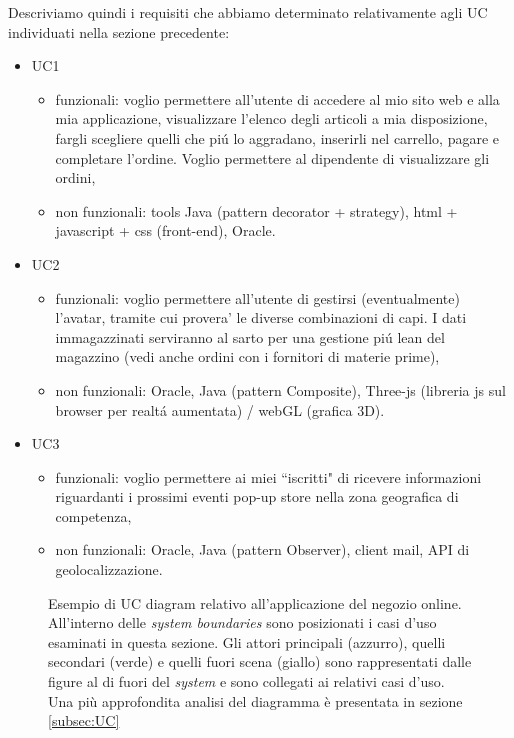 \documentclass[12pt]{article}
\begin{document}
Descriviamo quindi i requisiti che abbiamo determinato relativamente agli UC individuati nella sezione precedente: 
\begin{itemize}
	\item UC1
		\begin{itemize}
		\item funzionali: voglio permettere all'utente di accedere al mio sito web e alla mia applicazione, visualizzare l'elenco degli articoli a mia disposizione, fargli scegliere quelli che pi\'u lo aggradano, inserirli nel carrello, pagare e completare l'ordine. Voglio permettere al dipendente di visualizzare gli ordini, 
		\item non funzionali: tools Java (pattern decorator + strategy), html + javascript + css (front-end), Oracle. 
		\end{itemize}
	\item UC2
		\begin{itemize}
		\item funzionali: voglio permettere all'utente di gestirsi (eventualmente) l'avatar, tramite cui provera' le diverse combinazioni di capi. I dati immagazzinati serviranno al sarto per una gestione pi\'u lean del magazzino (vedi anche ordini con i fornitori di materie prime),
		\item non funzionali: Oracle, Java (pattern Composite), Three-js (libreria js sul browser per realt\'a aumentata) / webGL (grafica 3D).
		\end{itemize}
	\item UC3
		\begin{itemize}
		\item funzionali: voglio permettere ai miei ``iscritti" di ricevere informazioni riguardanti i prossimi eventi pop-up store nella zona geografica di competenza,
		\item non funzionali: Oracle, Java (pattern Observer), client mail, API di geolocalizzazione.
		\end{itemize}
\end{itemize}

\vspace{0.5cm}
\begin{figure}[t]
  \centering
   \makebox[\textwidth][c]{}
   \vspace{0.5cm}
  \caption{\small Esempio di UC diagram relativo all'applicazione del negozio online. All'interno delle {\em system boundaries} sono posizionati i casi d'uso esaminati in questa sezione. Gli attori principali (azzurro), quelli secondari (verde) e quelli fuori scena (giallo) sono rappresentati dalle figure al di fuori del {\em system} e sono collegati ai relativi casi d'uso. Una più approfondita analisi del diagramma è presentata in sezione \ref{subsec:UC}}
  \label{fig:UC_diagram}
\end{figure}
\end{document}
